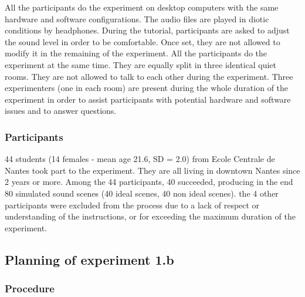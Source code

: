 \documentclass[twoside,twocolumn]{article}
\begin{document}
All the participants do the experiment on desktop computers with the same hardware and software configurations. The audio files are played in diotic conditions by headphones. During the tutorial, participants are asked to adjust the sound level in order to be comfortable. Once set, they are not allowed to modify it in the remaining of the experiment.
All the participants do the experiment at the same time. They are equally split in three identical quiet rooms. They are not allowed to talk to each other during the experiment.
Three experimenters (one in each room) are present during the whole duration of the experiment in order to assist participants with potential hardware and software issues and to answer questions.

\subsubsection*{Participants}

%

44 students (14 females - mean age 21.6, SD = 2.0) from Ecole Centrale de Nantes took part to the experiment. They are all living in downtown Nantes since 2 years or more.
Among the 44 participants, 40 succeeded, producing in the end 80 simulated sound scenes (40 ideal scenes, 40 non ideal scenes). the 4 other participants were excluded from the process due to a lack of respect or understanding of the instructions, or for exceeding the maximum duration of the experiment.

\subsection{Planning of experiment 1.b}
\label{sec:xp1b_plan}

\subsubsection*{Procedure}
\end{document}
